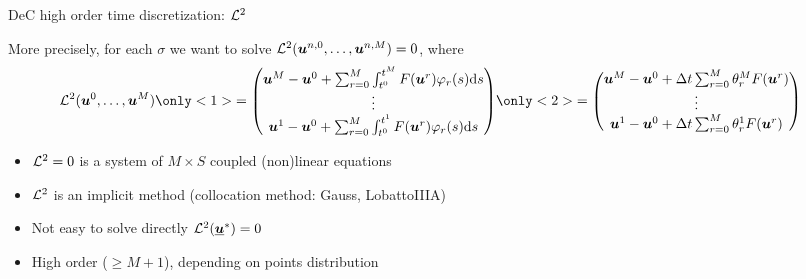 \documentclass[aspectratio=169]{beamer}
\begin{document}
\begin{frame}{DeC high order time discretization: $\mathcal{L}^2$}
	\begin{minipage}{0.77\textwidth}
		More precisely, for each $\sigma$ we want to solve $\mathcal{L}^2 (\boldsymbol{u}^{n,0},\dots,\boldsymbol{u}^{n,M})=0$, where 
		{\begin{align*}
			\L^2(\bc^0, \dots, \bc^M) &
			\only<1>{=
			\begin{pmatrix}
				\bc^M-\bc^0 +\sum_{r=0}^M \int_{t^0}^{t^M} F(\bc^r) \varphi_r(s) \diff s\\
				\vdots\\
				\bc^1-\bc^0 + \sum_{r=0}^M \int_{t^0}^{t^1} F(\bc^r) \varphi_r(s) \diff s
			\end{pmatrix}
		}
			\only<2>{=
			\begin{pmatrix}
				\bc^M-\bc^0 +\Delta t \sum_{r=0}^M \theta_r^M F(\bc^r) \\
				\vdots\\
				\bc^1-\bc^0 + \Delta t \sum_{r=0}^M  \theta_r^1  F(\bc^r) 
			\end{pmatrix}}
		\end{align*}
	}
		\begin{itemize}
			\item $\mathcal{L}^2=0$ is a system of $M \times S$ coupled (non)linear equations
			\item $\mathcal{L}^2$ is an implicit method (collocation method: Gauss, LobattoIIIA)
			\item Not easy to solve directly $\mathcal{L}^2(\underline{\boldsymbol{u}}^*)=0$
			\item High order ($\geq M+1$), depending on points distribution
		\end{itemize}
		
	\end{minipage}\hfill
	\begin{minipage}{0.2\textwidth}
		\begin{figure}[h]
			\centering
		\end{figure}
	\end{minipage}
\end{frame}
\end{document}
